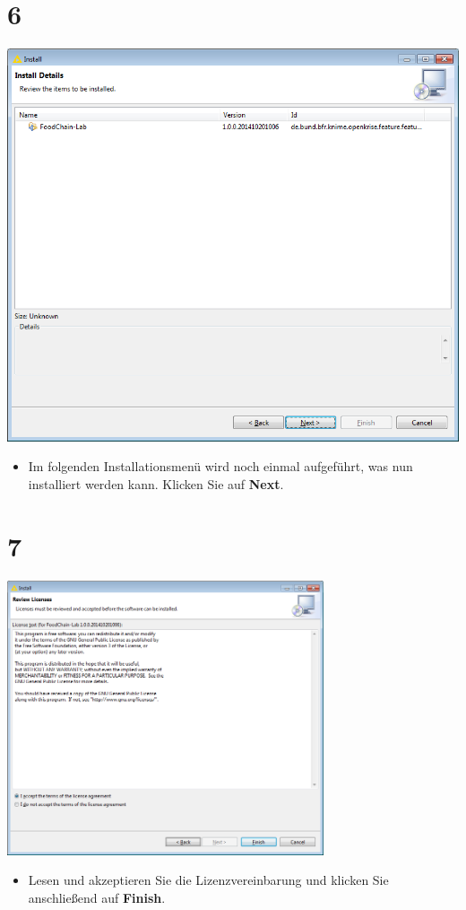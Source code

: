 \documentclass{beamer}
\begin{document}
\section{6}
\begin{frame}
	\begin{center}
  		\includegraphics[height=0.7\textheight]{6.png}
	\end{center}
	\begin{itemize}
		\item Im folgenden Installationsmenü wird noch einmal aufgeführt, was nun installiert werden kann. Klicken Sie auf \textbf{Next}.
	\end{itemize}
\end{frame}

\section{7}
\begin{frame}
	\begin{center}
  		\includegraphics[width=0.7\textwidth]{7.png}
	\end{center}
	\begin{itemize}
		\item Lesen und akzeptieren Sie die Lizenzvereinbarung und klicken Sie anschließend auf \textbf{Finish}.
	\end{itemize}
\end{frame}
\end{document}
